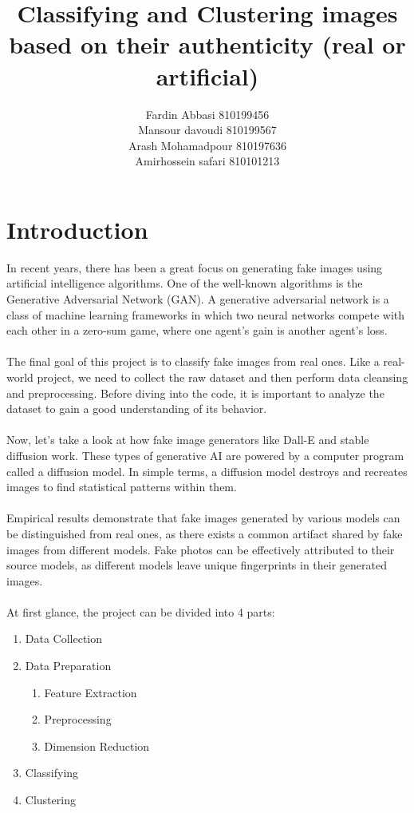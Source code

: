 \documentclass{template}
\title{Classifying and Clustering images based on their authenticity (real or artificial)}
\author{Fardin Abbasi 810199456\\\vspace{0.1cm} Mansour davoudi 810199567\\\vspace{0.1cm} Arash Mohamadpour 810197636\\\vspace{0.1cm} Amirhossein safari 810101213}
\begin{document}
\chapter{Introduction}\label{ch:in}
\fontsize{13}{15}\selectfont
In recent years, there has been a great focus on generating fake images using artificial intelligence algorithms. One of the well-known algorithms is the Generative Adversarial Network (GAN). A generative adversarial network is a class of machine learning frameworks in which two neural networks compete with each other in a zero-sum game, where one agent's gain is another agent's loss.\\\\
The final goal of this project is to classify fake images from real ones. Like a real-world project, we need to collect the raw dataset and then perform data cleansing and preprocessing. Before diving into the code, it is important to analyze the dataset to gain a good understanding of its behavior.\\\\
Now, let's take a look at how fake image generators like Dall-E and stable diffusion work. These types of generative AI are powered by a computer program called a diffusion model. In simple terms, a diffusion model destroys and recreates images to find statistical patterns within them.\\\\ 
Empirical results demonstrate that fake images generated by various models can be distinguished from real ones, as there exists a common artifact shared by fake images from different models. Fake photos can be effectively attributed to their source models, as different models leave unique fingerprints in their generated images.\cite{gulawani2006cfd}
\\\\At first glance, the project can be divided into 4 parts:
\begin{enumerate}
  \item Data Collection
  \item Data Preparation
    \begin{enumerate}
      \item Feature Extraction
      \item Preprocessing
      \item Dimension Reduction
    \end{enumerate}
  \item Classifying
  \item Clustering
\end{enumerate}
\end{document}
